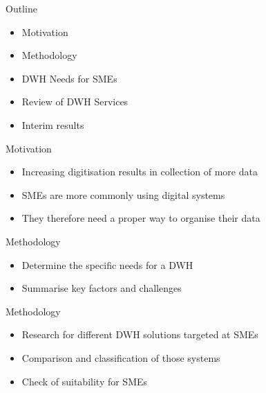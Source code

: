 \documentclass[aspectratio=169]{beamer}
\begin{document}
  \maketitle

   \begin{frame}{Outline}
    \begin{itemize}
      \item Motivation
      \item Methodology
      \item DWH Needs for SMEs
      \item Review of DWH Services
      \item Interim results
    \end{itemize}
  \end{frame}

  \begin{frame}{Motivation}
    \begin{itemize}
      \item Increasing digitisation results in collection of more data
      \item SMEs are more commonly using digital systems
      \item They therefore need a proper way to organise their data
    \end{itemize}
  \end{frame}

  \begin{frame}{Methodology}
    \begin{itemize}
      \item Determine the specific needs for a DWH
      \item Summarise key factors and challenges
    \end{itemize}
  \end{frame}

  \begin{frame}{Methodology}
    \begin{itemize}
      \item Research for different DWH solutions targeted at SMEs
      \item Comparison and classification of those systems
      \item Check of suitability for SMEs
    \end{itemize}
  \end{frame}
\end{document}
